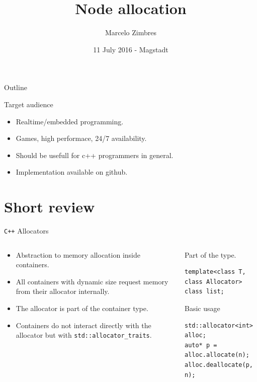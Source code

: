 \documentclass[10pt,aspectratio=169]{beamer}
\title[Node allocation] {Node allocation}
\subtitle
{Marcelo Zimbres}
\institute[Marcelo Zimbres - Software Developer - Physicist]
{
}
\date[11 July 2016 - Magstadt - Germany] {11 July 2016 - Magstadt}
\begin{document}
\begin{frame}
  \titlepage
\end{frame}

\begin{frame}{Outline}
  \tableofcontents[]
\end{frame}



\begin{frame}{Target audience}{}
\begin{itemize}
    \item Realtime/embedded programming.
    \item Games, high performace, 24/7 availability.
    \item Should be usefull for c++ programmers in general.
    \item Implementation available on github.
\end{itemize}
\end{frame}

\section{Short review}
\begin{frame}[fragile]{\texttt{C++} Allocators}
\begin{columns}
\begin{column}{0.5\textwidth}
\begin{itemize}
\item Abstraction to memory allocation inside containers.
\item All containers with dynamic size request memory from
their allocator internally.
\item The allocator is part of the container type.
\item Containers do not interact directly with the allocator but with
\texttt{std::allocator\_traits}.
\end{itemize}
\end{column}

\begin{column}{0.5\textwidth}
Part of the type.
\begin{lstlisting}
template<class T, class Allocator>
class list;
\end{lstlisting}

Basic usage
\begin{lstlisting}
std::allocator<int> alloc;
auto* p = alloc.allocate(n);
alloc.deallocate(p, n);
\end{lstlisting}
\end{column}
\end{columns}
\end{frame}
\end{document}
